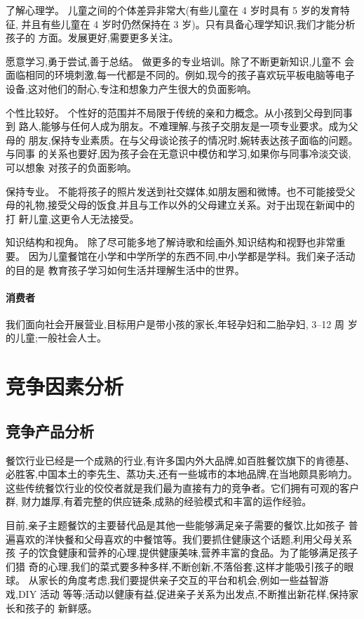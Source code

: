 了解心理学。
儿童之间的个体差异非常大(有些儿童在 4 岁时具有 5 岁的发育特征,
并且有些儿童在 4 岁时仍然保持在 3 岁)。只有具备心理学知识,我们才能分析孩子的
方面。发展更好,需要更多关注。

愿意学习,勇于尝试,善于总结。
做更多的专业培训。除了不断更新知识,儿童不
会面临相同的环境刺激,每一代都是不同的。例如,现今的孩子喜欢玩平板电脑等电子
设备,这对他们的耐心,专注和想象力产生很大的负面影响。

个性比较好。
个性好的范围并不局限于传统的亲和力概念。从小孩到父母到同事到
路人,能够与任何人成为朋友。不难理解,与孩子交朋友是一项专业要求。成为父母的
朋友,保持专业素质。在与父母谈论孩子的情况时,婉转表达孩子面临的问题。与同事
的关系也要好,因为孩子会在无意识中模仿和学习,如果你与同事冷淡交谈,可以想象
对孩子的负面影响。

保持专业。
不能将孩子的照片发送到社交媒体,如朋友圈和微博。也不可能接受父
母的礼物,接受父母的饭食,并且与工作以外的父母建立关系。对于出现在新闻中的打
鼾儿童,这更令人无法接受。

知识结构和视角。
除了尽可能多地了解诗歌和绘画外,知识结构和视野也非常重要。
因为儿童餐馆在小学和中学所学的东西不同,中小学都是学科。我们亲子活动的目的是
教育孩子学习如何生活并理解生活中的世界。

\paragraph{消费者}
我们面向社会开展营业,目标用户是带小孩的家长,年轻孕妇和二胎孕妇, 3--12 周
岁的儿童;一般社会人士。

\section{竞争因素分析}

\subsection{竞争产品分析}
餐饮行业已经是一个成熟的行业,有许多国内外大品牌,如百胜餐饮旗下的肯德基、
必胜客,中国本土的李先生、蒸功夫,还有一些城市的本地品牌,在当地颇具影响力。
这些传统餐饮行业的佼佼者就是我们最为直接有力的竞争者。它们拥有可观的客户群,
财力雄厚,有着完整的供应链条,成熟的经验模式和丰富的运作经验。

目前,亲子主题餐饮的主要替代品是其他一些能够满足亲子需要的餐饮,比如孩子
普遍喜欢的洋快餐和父母喜欢的中餐馆等。我们要抓住健康这个话题,利用父母关系孩
子的饮食健康和营养的心理,提供健康美味,营养丰富的食品。为了能够满足孩子们猎
奇的心理,我们的菜式要多种多样,不断创新,不落俗套,这样才能吸引孩子的眼球。
从家长的角度考虑,我们要提供亲子交互的平台和机会,例如一些益智游戏,DIY 活动
等等;活动以健康有益,促进亲子关系为出发点,不断推出新花样,保持家长和孩子的
新鲜感。


